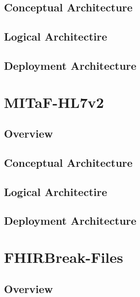 \documentclass[a4paper]{book}
\begin{document}
\section{Conceptual Architecture}
\section{Logical Architectire}
\section{Deployment Architecture}

\chapter{MITaF-HL7v2}
\section{Overview}
\section{Conceptual Architecture}
\section{Logical Architectire}
\section{Deployment Architecture}

\chapter{FHIRBreak-Files}
\section{Overview}
\end{document}
